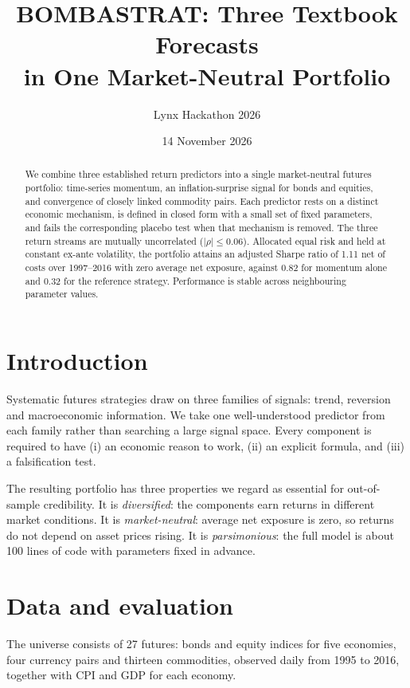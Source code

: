\documentclass[10.5pt,a4paper]{article}
\title{\textbf{BOMBASTRAT: Three Textbook Forecasts\\in One Market-Neutral Portfolio}}
\author{Lynx Hackathon 2026}
\date{14 November 2026}
\begin{document}
\maketitle

\begin{abstract}
\noindent We combine three established return predictors into a single market-neutral futures portfolio: time-series momentum, an inflation-surprise signal for bonds and equities, and convergence of closely linked commodity pairs. Each predictor rests on a distinct economic mechanism, is defined in closed form with a small set of fixed parameters, and fails the corresponding placebo test when that mechanism is removed. The three return streams are mutually uncorrelated ($|\rho|\le 0.06$). Allocated equal risk and held at constant ex-ante volatility, the portfolio attains an adjusted Sharpe ratio of 1.11 net of costs over 1997--2016 with zero average net exposure, against 0.82 for momentum alone and 0.32 for the reference strategy. Performance is stable across neighbouring parameter values.
\end{abstract}

\section{Introduction}
Systematic futures strategies draw on three families of signals: trend, reversion and macroeconomic information. We take one well-understood predictor from each family rather than searching a large signal space. Every component is required to have (i) an economic reason to work, (ii) an explicit formula, and (iii) a falsification test.

The resulting portfolio has three properties we regard as essential for out-of-sample credibility. It is \emph{diversified}: the components earn returns in different market conditions. It is \emph{market-neutral}: average net exposure is zero, so returns do not depend on asset prices rising. It is \emph{parsimonious}: the full model is about 100 lines of code with parameters fixed in advance.

\section{Data and evaluation}
The universe consists of 27 futures: bonds and equity indices for five economies, four currency pairs and thirteen commodities, observed daily from 1995 to 2016, together with CPI and GDP for each economy.
\end{document}
